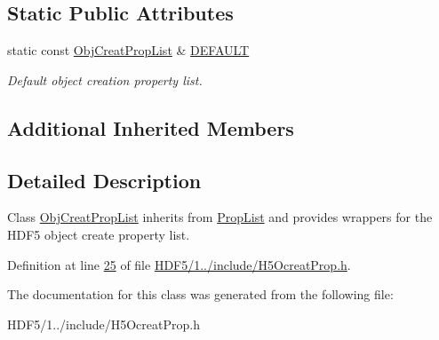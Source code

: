 \subsection*{Static Public Attributes}
\begin{DoxyCompactItemize}
\item 
\mbox{\label{class_h5_1_1_obj_creat_prop_list_a786366fcea5bb716dc963074823d2d45}} 
static const \hyperlink{class_h5_1_1_obj_creat_prop_list}{Obj\+Creat\+Prop\+List} \& \hyperlink{class_h5_1_1_obj_creat_prop_list_a786366fcea5bb716dc963074823d2d45}{D\+E\+F\+A\+U\+LT}
\begin{DoxyCompactList}\small\item\em Default object creation property list. \end{DoxyCompactList}\end{DoxyCompactItemize}
\subsection*{Additional Inherited Members}


\subsection{Detailed Description}
Class \hyperlink{class_h5_1_1_obj_creat_prop_list}{Obj\+Creat\+Prop\+List} inherits from \hyperlink{class_h5_1_1_prop_list}{Prop\+List} and provides wrappers for the H\+D\+F5 object create property list. 

Definition at line \hyperlink{_h_d_f5_21_810_81_2include_2_h5_ocreat_prop_8h_source_l00025}{25} of file \hyperlink{_h_d_f5_21_810_81_2include_2_h5_ocreat_prop_8h_source}{H\+D\+F5/1../include/\+H5\+Ocreat\+Prop.\+h}.



The documentation for this class was generated from the following file\+:\begin{DoxyCompactItemize}
\item 
H\+D\+F5/1../include/\+H5\+Ocreat\+Prop.\+h\end{DoxyCompactItemize}
